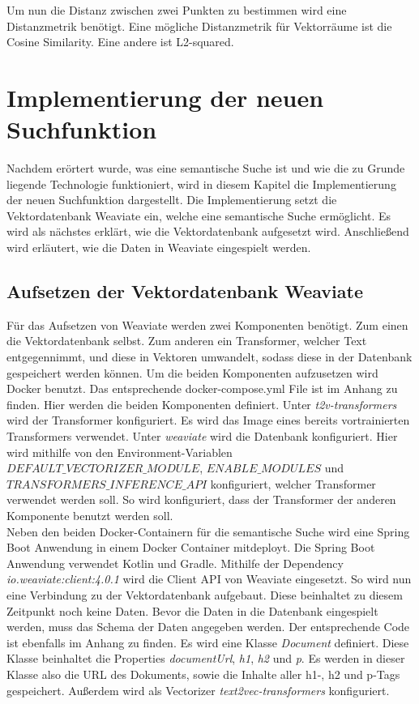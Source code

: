 Um nun die Distanz zwischen zwei Punkten zu bestimmen wird eine Distanzmetrik benötigt.
Eine mögliche Distanzmetrik für Vektorräume ist die Cosine Similarity.
Eine andere ist L2-squared.

\section{Implementierung der neuen Suchfunktion}
\label{chap:implementierung}
Nachdem erörtert wurde, was eine semantische Suche ist und wie die zu Grunde liegende Technologie funktioniert, wird in diesem Kapitel die Implementierung der neuen Suchfunktion dargestellt.
Die Implementierung setzt die Vektordatenbank Weaviate ein, welche eine semantische Suche ermöglicht.
Es wird als nächstes erklärt, wie die Vektordatenbank aufgesetzt wird.
Anschließend wird erläutert, wie die Daten in Weaviate eingespielt werden.

\subsection{Aufsetzen der Vektordatenbank Weaviate}
Für das Aufsetzen von Weaviate werden zwei Komponenten benötigt.
Zum einen die Vektordatenbank selbst.
Zum anderen ein Transformer, welcher Text entgegennimmt, und diese in Vektoren umwandelt, sodass diese in der Datenbank gespeichert werden können.
Um die beiden Komponenten aufzusetzen wird Docker benutzt.
Das entsprechende docker-compose.yml File ist im Anhang zu finden.
Hier werden die beiden Komponenten definiert.
Unter \textit{t2v-transformers} wird der Transformer konfiguriert.
Es wird das Image eines bereits vortrainierten Transformers verwendet.
Unter \textit{weaviate} wird die Datenbank konfiguriert.
Hier wird mithilfe von den Environment-Variablen \textit{$DEFAULT\_VECTORIZER\_MODULE$}, \textit{$ENABLE\_MODULES$} und \textit{$TRANSFORMERS\_INFERENCE\_API$} konfiguriert, welcher Transformer verwendet werden soll.
So wird konfiguriert, dass der Transformer der anderen Komponente benutzt werden soll.\\

Neben den beiden Docker-Containern für die semantische Suche wird eine Spring Boot Anwendung in einem Docker Container mitdeployt.
Die Spring Boot Anwendung verwendet Kotlin und Gradle.
Mithilfe der Dependency \textit{io.weaviate:client:4.0.1} wird die Client API von Weaviate eingesetzt.
So wird nun eine Verbindung zu der Vektordatenbank aufgebaut.
Diese beinhaltet zu diesem Zeitpunkt noch keine Daten.
Bevor die Daten in die Datenbank eingespielt werden, muss das Schema der Daten angegeben werden.
Der entsprechende Code ist ebenfalls im Anhang zu finden.
Es wird eine Klasse \textit{Document} definiert.
Diese Klasse beinhaltet die Properties \textit{documentUrl}, \textit{h1}, \textit{h2} und \textit{p}.
Es werden in dieser Klasse also die URL des Dokuments, sowie die Inhalte aller h1-, h2 und p-Tags gespeichert.
Außerdem wird als Vectorizer \textit{text2vec-transformers} konfiguriert.\\

